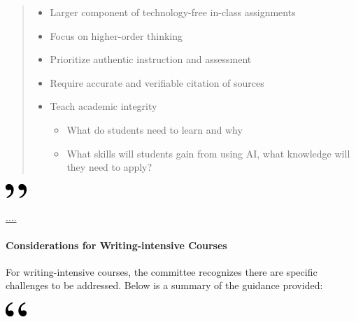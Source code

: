 \documentclass[
]{book}
\begin{document}
\begin{quote}
\begin{itemize}
\item
  Larger component of technology-free in-class assignments
\item
  Focus on higher-order thinking
\item
  Prioritize authentic instruction and assessment
\item
  Require accurate and verifiable citation of sources
\item
  Teach academic integrity

  \begin{itemize}
  \item
    What do students need to learn and why
  \item
    What skills will students gain from using AI, what knowledge will they need to apply?
  \end{itemize}
\end{itemize}
\end{quote}

\includegraphics[width=0.3125in,height=0.20833in]{close.png}

\url{....}

\hypertarget{considerations-for-writing-intensive-courses}{%
\paragraph*{Considerations for Writing-intensive Courses}\label{considerations-for-writing-intensive-courses}}

For writing-intensive courses, the committee recognizes there are specific challenges to be addressed. Below is a summary of the guidance provided:

\includegraphics[width=0.3125in,height=0.20833in]{open.png}
\end{document}

